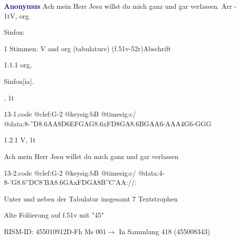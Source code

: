 \documentclass[twocolumn, 12pt]{book}
\begin{document}
\par \vspace{16pt} \textcolor{darkblue}{\textbf{Anonymus  }}\hfillplus{\textbf{[13]}}\newline Ach mein Herr Jesu willst du mich ganz und gar verlassen. Arr - 1t\newline V, org
\par \begin{itshape}[f.51v, at left:] Sinfon:\end{itshape} 
\par \textcolor{darkblue}{}  1 Stimmen: V and org (tabulature)  (f.51v-52r)\newline Abschrift
\par 1.1.1  org, \begin{itshape}Sinfon[ia].\end{itshape}, 1t  
\begin{filecontents*}{13-1.code}
@clef:G-2
@keysig:bB
@timesig:c/
@data:8-''D{8.6AA8D6EF}{GAG8.6xFD}{8GA8.6BG}{AA}6-A{AA}4G6-{GGG}
\end{filecontents*}
\newline %
\par 1.2.1  V, 1t\newline \begin{footnotesize} Ach mein Herr Jesu willst du mich ganz und gar verlassen \end{footnotesize}  
\begin{filecontents*}{13-2.code}
@clef:G-2
@keysig:bB
@timesig:c/
@data:4-8-'G{8.6''DC8'BA}{8.6GAxFD}{GA8B''C}{'AA}://:
\end{filecontents*}
\newline %
\par Unter und neben der Tabulatur insgesamt 7 Textstrophen
\par Alte Foliierung auf f.51v mit "45"
\par RISM-ID: 455010912\newline D-Fh  Ms 001\newline $\rightarrow$ In Sammlung 418 (455008343)
      
\end{document}
